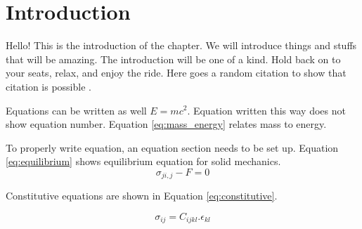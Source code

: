 



\section{Introduction}

Hello! This is the introduction of the chapter. We will introduce things and stuffs that will be amazing. The introduction
will be one of a kind. Hold back on to your seats, relax, and enjoy the ride.
Here goes a random citation to show that citation is possible \cite{blom2006detection}.

Equations can be written as well $E=mc^2\label{eq:mass_energy}$. Equation written this way does not show equation number.
Equation \ref{eq:mass_energy} relates mass to energy.

To properly write equation, an equation section needs to be set up. Equation \ref{eq:equilibrium} shows equilibrium equation for solid mechanics.
\begin{equation}
    \sigma_{ji,j}-F=0 \label{eq:equilibrium}
\end{equation}

Constitutive equations are shown in Equation \ref{eq:constitutive}.

\begin{equation}
    \sigma_{ij} = C_{ijkl}.\epsilon_{kl}   \label{eq:constitutive}
\end{equation}


